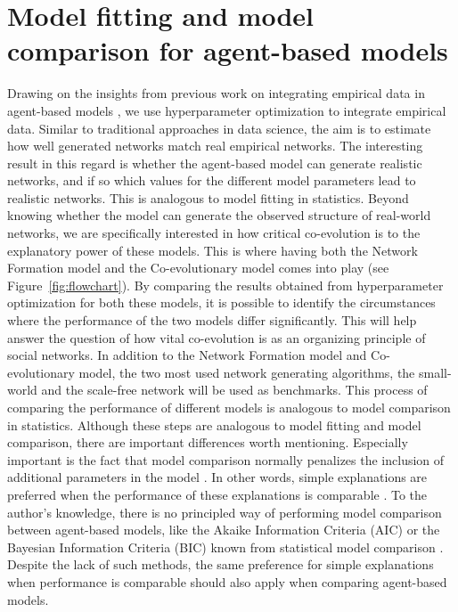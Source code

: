 \documentclass[11pt]{article}
\begin{document}
\section{Model fitting and model comparison for agent-based models}
\noindent Drawing on the insights from previous work on integrating empirical data in agent-based models \cite{kerr2021covasim, krivorotko2022agent}, we use hyperparameter optimization to integrate empirical data. Similar to traditional approaches in data science, the aim is to estimate how well generated networks match real empirical networks. The interesting result in this regard is whether the agent-based model can generate realistic networks, and if so which values for the different model parameters lead to realistic networks. This is analogous to model fitting in statistics. Beyond knowing whether the model can generate the observed structure of real-world networks, we are specifically interested in how critical co-evolution is to the explanatory power of these models. This is where having both the Network Formation model and the Co-evolutionary model comes into play (see Figure~\ref{fig:flowchart}). By comparing the results obtained from hyperparameter optimization for both these models, it is possible to identify the circumstances where the performance of the two models differ significantly. This will help answer the question of how vital co-evolution is as an organizing principle of social networks. In addition to the Network Formation model and Co-evolutionary model, the two most used network generating algorithms, the small-world \cite{watts_collective_1998} and the scale-free network \cite{barabasi_scale-free_2003} will be used as benchmarks. This process of comparing the performance of different models is analogous to model comparison in statistics. 
Although these steps are analogous to model fitting and model comparison, there are important differences worth mentioning. Especially important is the fact that model comparison normally penalizes the inclusion of additional parameters in the model \cite{vrieze_model_2012}. In other words, simple explanations are preferred when the performance of these explanations is comparable \cite{ emiliano2014information, vrieze_model_2012}. To the author's knowledge, there is no principled way of performing model comparison between agent-based models, like the Akaike Information Criteria (AIC) or the Bayesian Information Criteria (BIC) known from statistical model comparison \cite{vrieze_model_2012}. Despite the lack of such methods, the same preference for simple explanations when performance is comparable should also apply when comparing agent-based models.
\end{document}
